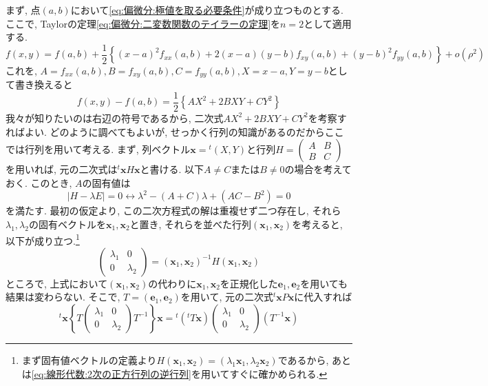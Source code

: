         まず, 点$(a,b)$において\eqref{eq:偏微分:極値を取る必要条件}が成り立つものとする. ここで, Taylorの定理\eqref{eq:偏微分:二変数関数のテイラーの定理}を$n=2$として適用する.
        \begin{equation*}
            f(x,y)=f(a,b)+\frac{1}{2}\left\{(x-a)^2f_{xx}(a,b)+2(x-a)(y-b)f_{xy}(a,b)+(y-b)^2f_{yy}(a,b)\right\}+o(\rho^2)
        \end{equation*}
        これを, $A=f_{xx}(a,b),B=f_{xy}(a,b),C=f_{yy}(a,b),X=x-a,Y=y-b$として書き換えると
        \begin{equation*}
            f(x,y)-f(a,b)=\frac{1}{2}\left\{AX^2+2BXY+CY^2\right\}
        \end{equation*}
        我々が知りたいのは右辺の符号であるから, 二次式$AX^2+2BXY+CY^2$を考察すればよい. どのように調べてもよいが, せっかく行列の知識があるのだからここでは行列を用いて考える.
        まず, 列ベクトル$\bm{x}={}^t\!(X,Y)$と行列$H=\begin{pmatrix}A & B \\ B & C\end{pmatrix}$を用いれば, 元の二次式は${}^t\!\bm{x}H\bm{x}$と書ける. 
        以下$A\neq C$または$B\neq0$の場合を考えておく. このとき, $A$の固有値は
        \begin{equation*}
            |H-\lambda E|=0 \leftrightarrow \lambda^2- (A+C)\lambda + (AC-B^2)=0
        \end{equation*}
        を満たす. 最初の仮定より, この二次方程式の解は重複せず二つ存在し, それら$\lambda_1,\lambda_2$の固有ベクトルを$\bm{x}_1,\bm{x}_2$と置き, それらを並べた行列$(\bm{x}_1,\bm{x}_2)$を考えると, 以下が成り立つ.\footnote{まず固有値ベクトルの定義より$H(\bm{x}_1,\bm{x}_2)=(\lambda_1\bm{x}_1,\lambda_2\bm{x}_2)$であるから, あとは\eqref{eq:線形代数:2次の正方行列の逆行列}を用いてすぐに確かめられる.}
        \begin{equation*}
            \begin{pmatrix}\lambda_1 & 0 \\0 & \lambda_2\end{pmatrix}=(\bm{x}_1,\bm{x}_2)^{-1}H(\bm{x}_1,\bm{x}_2)
        \end{equation*}
        ところで, 上式において$(\bm{x}_1,\bm{x}_2)$の代わりに$\bm{x}_1,\bm{x}_2$を正規化した$\bm{e}_1,\bm{e}_2$を用いても結果は変わらない.
        そこで, $T=(\bm{e}_1,\bm{e}_2)$を用いて, 元の二次式${}^t\!\bm{x}P\bm{x}$に代入すれば
        \begin{equation*}
            {}^t\!\bm{x}\left\{T\begin{pmatrix}\lambda_1 & 0 \\ 0 & \lambda_2\end{pmatrix}T^{-1}\right\}\bm{x}={}^t\!({}^t\!T\bm{x})\begin{pmatrix}\lambda_1 & 0 \\ 0 & \lambda_2\end{pmatrix}(T^{-1}\bm{x})
        \end{equation*}
